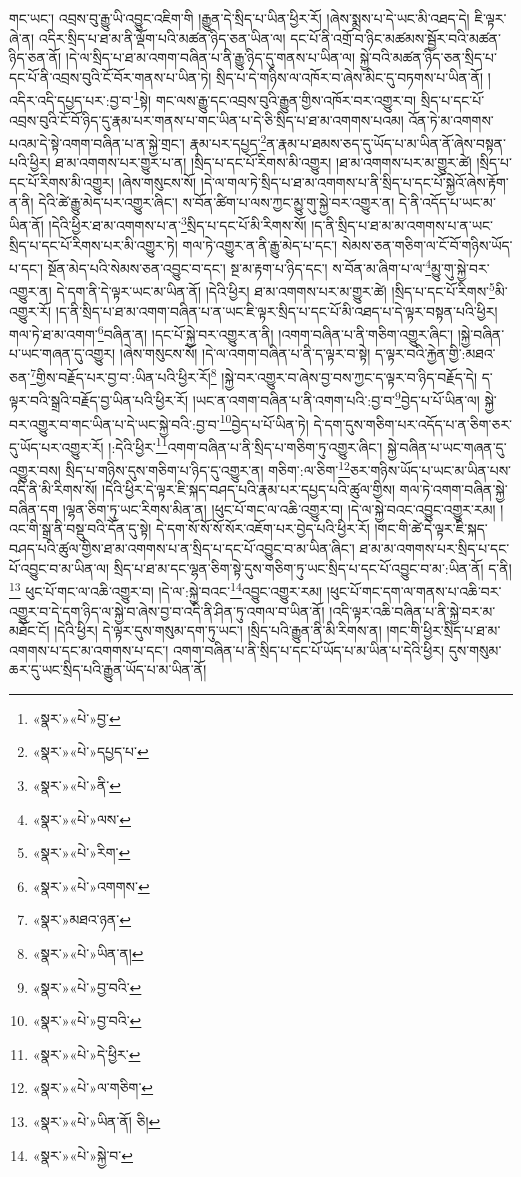 གང་ཡང་། འབྲས་བུ་རྒྱུ་ཡི་འབྱུང་འཇིག་གི །རྒྱུན་དེ་སྲིད་པ་ཡིན་ཕྱིར་རོ། །ཞེས་སྨྲས་པ་དེ་ཡང་མི་འཐད་དེ། ཇི་ལྟར་ཞེ་ན། འདིར་སྲིད་པ་ཐ་མ་ནི་ལྡོག་པའི་མཚན་ཉིད་ཅན་ཡིན་ལ། དང་པོ་ནི་འགྲོ་བ་ཉིང་མཚམས་སྦྱོར་བའི་མཚན་ཉིད་ཅན་ནོ། །དེ་ལ་སྲིད་པ་ཐ་མ་འགག་བཞིན་པ་ནི་རྒྱུ་ཉིད་དུ་གནས་པ་ཡིན་ལ། སྐྱེ་བའི་མཚན་ཉིད་ཅན་སྲིད་པ་དང་པོ་ནི་འབྲས་བུའི་ངོ་བོར་གནས་པ་ཡིན་ཏེ། སྲིད་པ་དེ་གཉིས་ལ་འཁོར་བ་ཞེས་མིང་དུ་བཏགས་པ་ཡིན་ནོ། །འདིར་འདི་དཔྱད་པར་:བྱ་བ་\footnote{«སྣར་»«པེ་»བྱ་}སྟེ། གང་ལས་རྒྱུ་དང་འབྲས་བུའི་རྒྱུན་གྱིས་འཁོར་བར་འགྱུར་བ། སྲིད་པ་དང་པོ་འབྲས་བུའི་ངོ་བོ་ཉིད་དུ་རྣམ་པར་གནས་པ་གང་ཡིན་པ་དེ་ཅི་སྲིད་པ་ཐ་མ་འགགས་པའམ། འོན་ཏེ་མ་འགགས་པའམ་དེ་སྟེ་འགག་བཞིན་པ་ན་སྐྱེ་གྲང་། རྣམ་པར་དཔྱད་\footnote{«སྣར་»«པེ་»དཔྱད་པ་}ན་རྣམ་པ་ཐམས་ཅད་དུ་ཡོད་པ་མ་ཡིན་ནོ་ཞེས་བསྟན་པའི་ཕྱིར། ཐ་མ་འགགས་པར་གྱུར་པ་ན། །སྲིད་པ་དང་པོ་རིགས་མི་འགྱུར། །ཐ་མ་འགགས་པར་མ་གྱུར་ཚེ། །སྲིད་པ་དང་པོ་རིགས་མི་འགྱུར། །ཞེས་གསུངས་སོ། །དེ་ལ་གལ་ཏེ་སྲིད་པ་ཐ་མ་འགགས་པ་ནི་སྲིད་པ་དང་པོ་སྐྱེའོ་ཞེས་རྟོག་ན་ནི། དེའི་ཚེ་རྒྱུ་མེད་པར་འགྱུར་ཞིང་། ས་བོན་ཚིག་པ་ལས་ཀྱང་མྱུ་གུ་སྐྱེ་བར་འགྱུར་ན། དེ་ནི་འདོད་པ་ཡང་མ་ཡིན་ནོ། །དེའི་ཕྱིར་ཐ་མ་འགགས་པ་ན་\footnote{«སྣར་»«པེ་»ནི་}སྲིད་པ་དང་པོ་མི་རིགས་སོ། །ད་ནི་སྲིད་པ་ཐ་མ་མ་འགགས་པ་ན་ཡང་སྲིད་པ་དང་པོ་རིགས་པར་མི་འགྱུར་ཏེ། གལ་ཏེ་འགྱུར་ན་ནི་རྒྱུ་མེད་པ་དང་། སེམས་ཅན་གཅིག་ལ་ངོ་བོ་གཉིས་ཡོད་པ་དང་། སྔོན་མེད་པའི་སེམས་ཅན་འབྱུང་བ་དང་། སྔ་མ་རྟག་པ་ཉིད་དང་། ས་བོན་མ་ཞིག་པ་ལ་\footnote{«སྣར་»«པེ་»ལས་}མྱུ་གུ་སྐྱེ་བར་འགྱུར་ན། དེ་དག་ནི་དེ་ལྟར་ཡང་མ་ཡིན་ནོ། །དེའི་ཕྱིར། ཐ་མ་འགགས་པར་མ་གྱུར་ཚེ། །སྲིད་པ་དང་པོ་རིགས་\footnote{«སྣར་»«པེ་»རིག་}མི་འགྱུར་རོ། །ད་ནི་སྲིད་པ་ཐ་མ་འགག་བཞིན་པ་ན་ཡང་ཇི་ལྟར་སྲིད་པ་དང་པོ་མི་འཐད་པ་དེ་ལྟར་བསྟན་པའི་ཕྱིར། གལ་ཏེ་ཐ་མ་འགག་\footnote{«སྣར་»«པེ་»འགགས་}བཞིན་ན། །དང་པོ་སྐྱེ་བར་འགྱུར་ན་ནི། །འགག་བཞིན་པ་ནི་གཅིག་འགྱུར་ཞིང་། །སྐྱེ་བཞིན་པ་ཡང་གཞན་དུ་འགྱུར། །ཞེས་གསུངས་སོ། །དེ་ལ་འགག་བཞིན་པ་ནི་ད་ལྟར་བ་སྟེ། ད་ལྟར་བའི་རྐྱེན་གྱི་:མཐའ་ཅན་\footnote{«སྣར་»མཐའ་ཉན་}གྱིས་བརྗོད་པར་བྱ་བ་:ཡིན་པའི་ཕྱིར་རོ།\footnote{«སྣར་»«པེ་»ཡིན་ན།} །སྐྱེ་བར་འགྱུར་བ་ཞེས་བྱ་བས་ཀྱང་ད་ལྟར་བ་ཉིད་བརྗོད་དེ། ད་ལྟར་བའི་སྒྲའི་བརྗོད་བྱ་ཡིན་པའི་ཕྱིར་རོ། །ཡང་ན་འགག་བཞིན་པ་ནི་འགག་པའི་:བྱ་བ་\footnote{«སྣར་»«པེ་»བྱ་བའི་}བྱེད་པ་པོ་ཡིན་ལ། སྐྱེ་བར་འགྱུར་བ་གང་ཡིན་པ་དེ་ཡང་སྐྱེ་བའི་:བྱ་བ་\footnote{«སྣར་»«པེ་»བྱ་བའི་}བྱེད་པ་པོ་ཡིན་ཏེ། དེ་དག་དུས་གཅིག་པར་འདོད་པ་ན་ཅིག་ཅར་དུ་ཡོད་པར་འགྱུར་རོ། །:དེའི་ཕྱིར་\footnote{«སྣར་»«པེ་»དེ་ཕྱིར་}འགག་བཞིན་པ་ནི་སྲིད་པ་གཅིག་ཏུ་འགྱུར་ཞིང་། སྐྱེ་བཞིན་པ་ཡང་གཞན་དུ་འགྱུར་བས། སྲིད་པ་གཉིས་དུས་གཅིག་པ་ཉིད་དུ་འགྱུར་ན། གཅིག་:ལ་ཅིག་\footnote{«སྣར་»«པེ་»ལ་གཅིག་}ཅར་གཉིས་ཡོད་པ་ཡང་མ་ཡིན་པས་འདི་ནི་མི་རིགས་སོ། །དེའི་ཕྱིར་དེ་ལྟར་ཇི་སྐད་བཤད་པའི་རྣམ་པར་དཔྱད་པའི་ཚུལ་གྱིས། གལ་ཏེ་འགག་བཞིན་སྐྱེ་བཞིན་དག །ལྷན་ཅིག་ཏུ་ཡང་རིགས་མིན་ན། །ཕུང་པོ་གང་ལ་འཆི་འགྱུར་བ། །དེ་ལ་སྐྱེ་བའང་འབྱུང་འགྱུར་རམ། །འང་གི་སྒྲ་ནི་བསྡུ་བའི་དོན་དུ་སྟེ། དེ་དག་སོ་སོ་སོ་སོར་འཇོག་པར་བྱེད་པའི་ཕྱིར་རོ། །གང་གི་ཚེ་དེ་ལྟར་ཇི་སྐད་བཤད་པའི་ཚུལ་གྱིས་ཐ་མ་འགགས་པ་ན་སྲིད་པ་དང་པོ་འབྱུང་བ་མ་ཡིན་ཞིང་། ཐ་མ་མ་འགགས་པར་སྲིད་པ་དང་པོ་འབྱུང་བ་མ་ཡིན་ལ། སྲིད་པ་ཐ་མ་དང་ལྷན་ཅིག་སྟེ་དུས་གཅིག་ཏུ་ཡང་སྲིད་པ་དང་པོ་འབྱུང་བ་མ་:ཡིན་ནོ། ད་ནི།\footnote{«སྣར་»«པེ་»ཡིན་ནོ། ཅི།} ཕུང་པོ་གང་ལ་འཆི་འགྱུར་བ། །དེ་ལ་:སྐྱེ་བའང་\footnote{«སྣར་»«པེ་»སྐྱེ་བ་}འབྱུང་འགྱུར་རམ། །ཕུང་པོ་གང་དག་ལ་གནས་པ་འཆི་བར་འགྱུར་བ་དེ་དག་ཉིད་ལ་སྐྱེ་བ་ཞེས་བྱ་བ་འདི་ནི་ཤིན་ཏུ་འགལ་བ་ཡིན་ནོ། །འདི་ལྟར་འཆི་བཞིན་པ་ནི་སྐྱེ་བར་མ་མཐོང་ངོ། །དེའི་ཕྱིར། དེ་ལྟར་དུས་གསུམ་དག་ཏུ་ཡང་། །སྲིད་པའི་རྒྱུན་ནི་མི་རིགས་ན། །གང་གི་ཕྱིར་སྲིད་པ་ཐ་མ་འགགས་པ་དང་མ་འགགས་པ་དང་། འགག་བཞིན་པ་ནི་སྲིད་པ་དང་པོ་ཡོད་པ་མ་ཡིན་པ་དེའི་ཕྱིར། དུས་གསུམ་ཆར་དུ་ཡང་སྲིད་པའི་རྒྱུན་ཡོད་པ་མ་ཡིན་ནོ། 